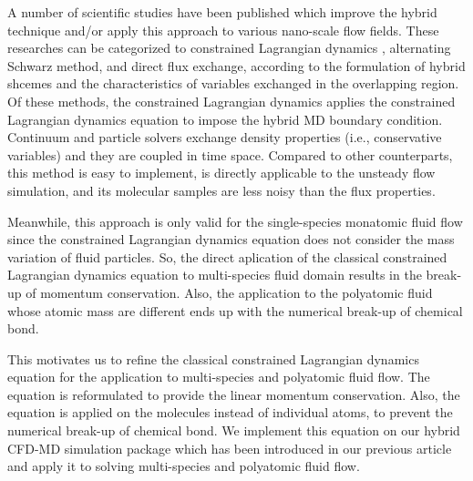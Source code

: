 \documentclass[]{aiaa-tc}%
\begin{document}
A number of scientific studies have been published which improve the hybrid
technique and/or apply this approach to various nano-scale flow fields.
These researches can be categorized to constrained Lagrangian dynamics
\cite{Thompson,Nie,Nie_cavity,Cui,Wang,Yen,Liu,JoCS2012}, alternating 
Schwarz method\cite{Hadjicon1,Hadjicon2,Hadjicon3,Werder,Kotsalis}, 
and direct flux exchange\cite{Flekkoy,Wagner,Delgado1,USHER,Time_Mechanism,Giupponi},
according to the formulation of hybrid shcemes and the characteristics of 
variables exchanged in the overlapping region. Of these methods, the 
constrained Lagrangian dynamics applies the constrained Lagrangian dynamics
equation to impose the hybrid MD boundary condition. Continuum and particle
solvers exchange density properties (i.e., conservative variables) 
and they are coupled in time space. Compared to other counterparts, this
method is easy to implement, is directly applicable to the unsteady flow 
simulation, and its molecular samples are less noisy than the flux properties.




Meanwhile, this approach is only valid for the single-species monatomic fluid 
flow since the constrained Lagrangian dynamics equation does not consider
the mass variation of fluid particles. So, the direct aplication of the classical
constrained Lagrangian dynamics equation to multi-species fluid domain results in
the break-up of momentum conservation. Also, the application to the polyatomic fluid
whose atomic mass are different ends up with the numerical break-up of chemical bond.

This motivates us to refine the classical constrained Lagrangian dynamics equation
for the application to multi-species and polyatomic fluid flow. The equation is
reformulated to provide the linear momentum conservation. Also, the equation is
applied on the molecules instead of individual atoms, to prevent the numerical
break-up of chemical bond. We implement this equation on our hybrid CFD-MD simulation
package which has been introduced in our previous article\cite{JoCS2012} and apply
it to solving multi-species and polyatomic fluid flow.
\end{document}
